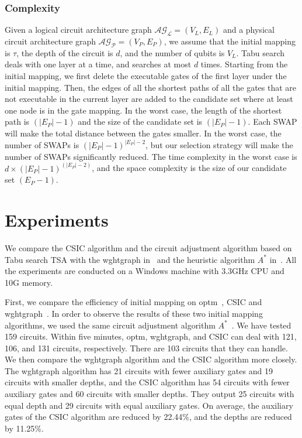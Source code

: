 \documentclass[runningheads]{llncs}
\begin{document}
\subsubsection{Complexity}
Given a logical circuit architecture graph  $\mathcal{AG_{L}}=(V_{L},E_{L})$ and a physical circuit architecture graph $\mathcal{AG_{P}}=(V_{P},E_{P})$, we assume that the initial mapping is $\tau$, the depth of the circuit is $d$, and the number of qubits is $V_{L}$. Tabu search deals with one layer at a time, and searches at most $d$ times. Starting from the initial mapping, we first delete the executable gates of the first layer under the initial mapping. Then, the edges of all the shortest paths of all the gates that are not executable in the current layer are added to the candidate set where at least one node is in the gate mapping. In the worst case, the length of the shortest path  is $(|E_{P}|-1)$
and the size of the candidate set  is $(|E_{P}|-1)$. Each SWAP will make the total distance between the gates smaller. In the worst case, the number of SWAPs is $(|E_{P}|-1)^{|E_{P}|-2}$, but our selection strategy will make the number of SWAPs significantly reduced. The time complexity in the worst case is $d\times (|E_{P}|-1)^{(|E_{P}|-2)}$, and the space complexity is the size of our candidate set $(E_{P}-1)$.
\section{Experiments}
\label{Experiment}
We compare the  CSIC  algorithm 
and the circuit adjustment algorithm based on Tabu search TSA with the wghtgraph in~\cite{2020Qubit} and the heuristic algorithm $ A^{*}$  in~\cite{Zulehner2017}.
All the experiments are conducted on a Windows machine with 3.3GHz CPU and 10G memory. 
 
First, we compare the efficiency of initial mapping on optm~\cite{Zulehner2017},  CSIC and wghtgraph~\cite{2020Qubit}. In order to  observe the results of these two initial mapping algorithms, we used the same circuit adjustment algorithm $A^{*}$~\cite{Zulehner2017}.
We have tested 159 circuits. Within five minutes, optm,  wghtgraph, and CSIC  can deal with 121, 106, and  131 circuits, respectively. There are 103 circuits that they can handle. We then compare the wghtgraph algorithm and the CSIC algorithm more closely. The wghtgraph algorithm has 21 circuits with fewer auxiliary gates  and 19 circuits with smaller depths, and the CSIC algorithm has 54 circuits with fewer auxiliary gates and 60 circuits with  smaller depths. They output 25 circuits with equal depth and  29 circuits with equal auxiliary gates. On average, the auxiliary gates of the CSIC algorithm are reduced by 22.44\%, 
and the depths are reduced by 11.25\%.
\end{document}
